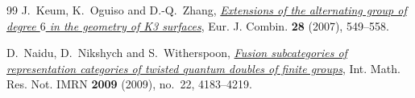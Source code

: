 \documentclass[11pt]{amsart}
\numberwithin{equation}{section}
\theoremstyle{definition}
\theoremstyle{plain}
\begin{document}
\begin{thebibliography}{99}
J.~Keum, K.~Oguiso and D.-Q.~Zhang,
\href{https://arxiv.org/abs/math/0408105}{\emph{Extensions of the alternating group of degree $6$ in the geometry of K3 surfaces}},
Eur. J. Combin. \textbf{28} (2007), 549--558.

D.~Naidu, D.~Nikshych and S.~Witherspoon,
\href{https://doi.org/10.1093/imrn/rnp084}{\emph{Fusion subcategories of representation categories of twisted quantum doubles of finite groups}},
Int. Math. Res. Not. IMRN \textbf{2009} (2009), no.~22, 4183--4219.
\end{thebibliography}
\end{document}
